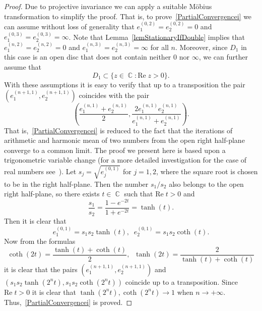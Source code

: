 \documentclass{amsart}
\numberwithin{equation}{section}
\theoremstyle{definition}
\theoremstyle{remark}
\DeclareMathOperator{\CC}{\mathbb C}
\begin{document}
	\begin{proof}
		Due to projective invariance we can apply a suitable M\"obius transformation to simplify the proof. That is, to prove~\ref{PartialConvergencei} we can assume without loss of generality that $e^{(0,2)}_{1} = e^{(0,2)}_{2} = 0$ and $e^{(0,3)}_{1} = e^{(0,3)}_{2} = \infty$. Note that Lemma~\ref{lemStationaryIfDouble} implies that $e^{(n,2)}_{1} = e^{(n,2)}_{2} = 0$ and $e^{(n,3)}_{1} = e^{(n,3)}_{2} = \infty$ for all $n$. Moreover, since $D_1$ in this case is an open disc that does not contain neither $0$ nor $\infty$, we can further assume that \[D_1 \subset \{z \in \CC: \mathrm{Re}\;z > 0\}.\] With these assumptions it is easy to verify that up to a transposition the pair $\left(e_1^{(n+1,1)}, e_2^{(n+1,1)}\right)$ coincides with the pair 
		\[
		\left( \frac{e_1^{(n,1)} + e_2^{(n,1)}}{2}, \frac{2e_1^{(n,1)}e_2^{(n,1)}}{e_1^{(n,1)} + e_2^{(n,1)}}\right).
		\]
		That is,~\ref{PartialConvergencei} is reduced to the fact that the iterations of arithmetic and harmonic mean of two numbers from the open right half-plane converge to a common limit. The proof we present here is based upon a trigonometric variable change (for a more detailed investigation for the case of real numbers see~\cite{NakamuraAHM}). Let $s_j = \sqrt{e_j^{(0,1)}}$ for $j = 1,2$, where the square root is chosen to be in the right half-plane. Then the number $s_1/s_2$ also belongs to the open right half-plane, so there exists $t \in \CC$ such that $\mathrm{Re}\; t > 0$ and
		\[
		\frac{s_1}{s_2} = \frac{1-e^{-2t}}{1+e^{-2t}} = \tanh(t).
		\]
		Then it is clear that 
		\[
		e_1^{(0,1)} = s_1s_2\tanh(t),\;\;e_2^{(0,1)} = s_1s_2\coth(t).
		\]
		Now from the formulas
		\[
		\coth(2t) = \frac{\tanh(t) + \coth(t)}{2},\;\;\tanh(2t) = \frac{2}{\tanh(t) + \coth(t)}
		\]
		it is clear that the pairs $\left(e_1^{(n+1,1)}, e_2^{(n+1,1)}\right)$ and $(s_1s_2\tanh(2^nt), s_1s_2\coth(2^nt))$ coincide up to a transposition. Since $\mathrm{Re}\; t > 0$ it is clear that $\tanh(2^nt),\coth(2^nt) \to 1$ when $n \to +\infty$. Thus,~\ref{PartialConvergencei} is proved.
		

\end{proof}
\end{document}
